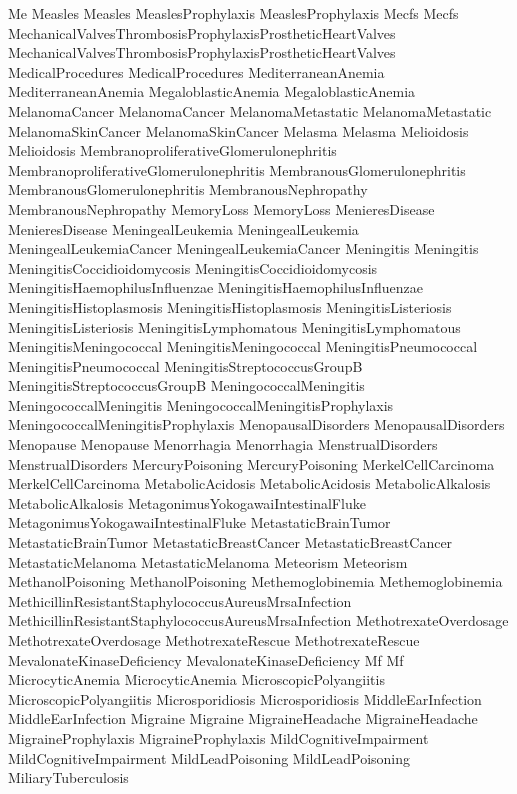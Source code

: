  Me
 Measles
 Measles
 MeaslesProphylaxis
 MeaslesProphylaxis
 Mecfs
 Mecfs
 MechanicalValvesThrombosisProphylaxisProstheticHeartValves
 MechanicalValvesThrombosisProphylaxisProstheticHeartValves
 MedicalProcedures
 MedicalProcedures
 MediterraneanAnemia
 MediterraneanAnemia
 MegaloblasticAnemia
 MegaloblasticAnemia
 MelanomaCancer
 MelanomaCancer
 MelanomaMetastatic
 MelanomaMetastatic
 MelanomaSkinCancer
 MelanomaSkinCancer
 Melasma
 Melasma
 Melioidosis
 Melioidosis
 MembranoproliferativeGlomerulonephritis
 MembranoproliferativeGlomerulonephritis
 MembranousGlomerulonephritis
 MembranousGlomerulonephritis
 MembranousNephropathy
 MembranousNephropathy
 MemoryLoss
 MemoryLoss
 MenieresDisease
 MenieresDisease
 MeningealLeukemia
 MeningealLeukemia
 MeningealLeukemiaCancer
 MeningealLeukemiaCancer
 Meningitis
 Meningitis
 MeningitisCoccidioidomycosis
 MeningitisCoccidioidomycosis
 MeningitisHaemophilusInfluenzae
 MeningitisHaemophilusInfluenzae
 MeningitisHistoplasmosis
 MeningitisHistoplasmosis
 MeningitisListeriosis
 MeningitisListeriosis
 MeningitisLymphomatous
 MeningitisLymphomatous
 MeningitisMeningococcal
 MeningitisMeningococcal
 MeningitisPneumococcal
 MeningitisPneumococcal
 MeningitisStreptococcusGroupB
 MeningitisStreptococcusGroupB
 MeningococcalMeningitis
 MeningococcalMeningitis
 MeningococcalMeningitisProphylaxis
 MeningococcalMeningitisProphylaxis
 MenopausalDisorders
 MenopausalDisorders
 Menopause
 Menopause
 Menorrhagia
 Menorrhagia
 MenstrualDisorders
 MenstrualDisorders
 MercuryPoisoning
 MercuryPoisoning
 MerkelCellCarcinoma
 MerkelCellCarcinoma
 MetabolicAcidosis
 MetabolicAcidosis
 MetabolicAlkalosis
 MetabolicAlkalosis
 MetagonimusYokogawaiIntestinalFluke
 MetagonimusYokogawaiIntestinalFluke
 MetastaticBrainTumor
 MetastaticBrainTumor
 MetastaticBreastCancer
 MetastaticBreastCancer
 MetastaticMelanoma
 MetastaticMelanoma
 Meteorism
 Meteorism
 MethanolPoisoning
 MethanolPoisoning
 Methemoglobinemia
 Methemoglobinemia
 MethicillinResistantStaphylococcusAureusMrsaInfection
 MethicillinResistantStaphylococcusAureusMrsaInfection
 MethotrexateOverdosage
 MethotrexateOverdosage
 MethotrexateRescue
 MethotrexateRescue
 MevalonateKinaseDeficiency
 MevalonateKinaseDeficiency
 Mf
 Mf
 MicrocyticAnemia
 MicrocyticAnemia
 MicroscopicPolyangiitis
 MicroscopicPolyangiitis
 Microsporidiosis
 Microsporidiosis
 MiddleEarInfection
 MiddleEarInfection
 Migraine
 Migraine
 MigraineHeadache
 MigraineHeadache
 MigraineProphylaxis
 MigraineProphylaxis
 MildCognitiveImpairment
 MildCognitiveImpairment
 MildLeadPoisoning
 MildLeadPoisoning
 MiliaryTuberculosis

